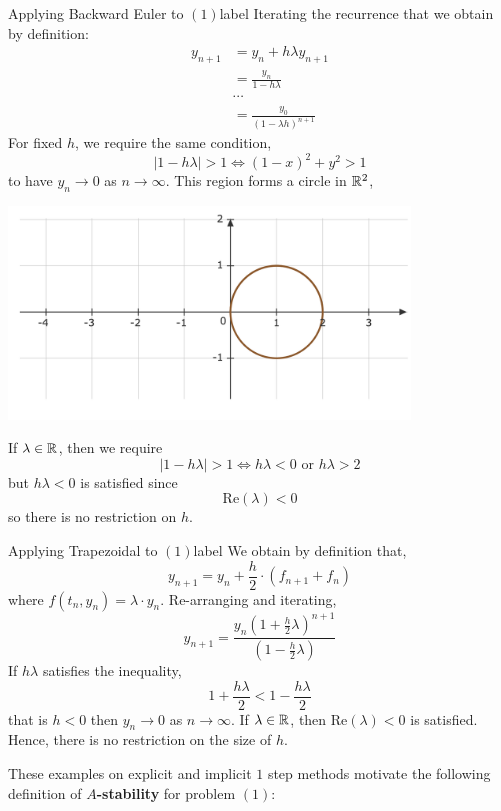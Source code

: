 \begin{ex}{Applying Backward Euler to $(1)$}{label}
	Iterating the recurrence that we obtain by definition:
	\begin{align*}
		y_{n+1} &= y_n + h\lambda y_{n+1} \\
			 &= \frac{y_n}{1-h\lambda} \\
			 &\cdots \\
			 &= \frac{y_0}{(1-\lambda h)^{n+1}}
	\end{align*}
	For fixed $h$, we require the same condition,
	\[|1-h\lambda| > 1 \iff (1-x)^2+y^2 > 1\]
	to have $y_n \rightarrow 0$ as $n \rightarrow \infty$. This region forms a circle in $\mathbb{R}^2$,
	\begin{center}
       \includegraphics[width=0.8\textwidth]{figures/fig-28.png}
       \end{center}
       If $\lambda \in \mathbb{R}$, then we require
       \[|1-h\lambda| > 1 \iff h \lambda < 0 \text{ or } h \lambda > 2\]
       but $h \lambda < 0$ is satisfied since
       \[\text{Re}(\lambda) < 0\]
       so there is no restriction on $h$.
\end{ex}

\begin{ex}{Applying Trapezoidal to $(1)$}{label}
	We obtain by definition that,
	\[y_{n+1}=y_n+\frac{h}{2} \cdot\left(f_{n+1}+f_n\right)\]
	where $f\left(t_n, y_n\right)=\lambda \cdot y_n$. Re-arranging and iterating,
	\[y_{n+1}=\frac{y_n\left(1+\frac{h}{2} \lambda\right)^{n+1}}{\left(1-\frac{h}{2} \lambda\right)}\]
	If $h \lambda$ satisfies the inequality,
	\[1+\frac{h \lambda}{2} < 1 - \frac{h\lambda}{2}\]
	that is $h < 0$
	then $y_n \rightarrow 0$ as $n \rightarrow \infty$. If $\lambda \in \mathbb{R}$, then $\text{Re}(\lambda) < 0$ is satisfied. Hence, there is no restriction on the size of $h$.
\end{ex}

These examples on explicit and implicit $1$ step methods motivate the following definition of \textbf{$A$-stability} for problem $(1)$:

